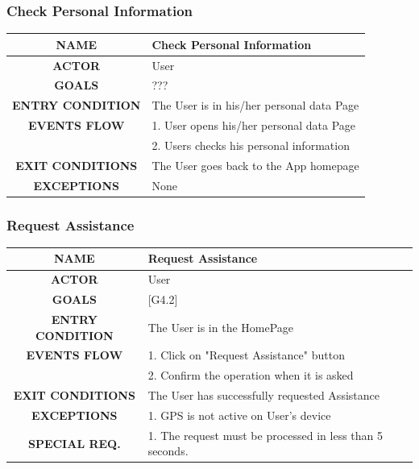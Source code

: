 \documentclass[12pt,a4paper]{article}
\begin{document}
		\subsubsection{Check Personal Information}
		\begin{center}
			\begin{tabular}{| c | l |}
				\hline
				\textbf{NAME} & Check Personal Information \\
				\hline
				\textbf{ACTOR} & User \\
				\hline
				\textbf{GOALS} & ??? \\
				\hline
				\textbf{ENTRY CONDITION} & The User is in his/her personal data Page \\ \hline
				\textbf{EVENTS FLOW}  &
				1. User opens his/her personal data Page\\
				&2. Users checks his personal information\\
				\hline
				\textbf{EXIT CONDITIONS}  & The User goes back to the App homepage \\ \hline
				\textbf{EXCEPTIONS} &
				None\\
				\hline
			\end{tabular}
		\end{center}

		\subsubsection{Request Assistance}
		\begin{center}
			\begin{tabular}{| c | l |}
				\hline
				\textbf{NAME} & Request Assistance \\
				\hline
				\textbf{ACTOR} & User \\
				\hline
				\textbf{GOALS} & [G4.2] \\
				\hline
				\textbf{ENTRY CONDITION} & The User is in the HomePage \\ \hline
				\textbf{EVENTS FLOW}  &
				1. Click on "Request Assistance" button\\
				&2. Confirm the operation when it is asked\\
				\hline
				\textbf{EXIT CONDITIONS}  & The User has successfully requested Assistance \\ \hline
				\textbf{EXCEPTIONS} &
				1. GPS is not active on User's device\\ \hline
				\textbf{SPECIAL REQ.} &
				1. The request must be processed in less than 5 seconds.\\
				\hline
			\end{tabular}
		\end{center}
\end{document}
